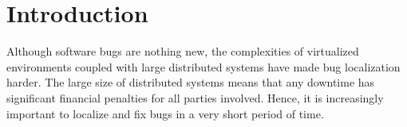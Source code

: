 \chapter{Introduction}
\label{sec:intro}

Although software bugs are nothing new, the complexities of virtualized environments coupled with large distributed systems have made bug localization harder.
The large size of distributed systems means that any downtime has significant financial penalties for all parties involved.
Hence, it is increasingly important to localize and fix bugs in a very short period of time.







